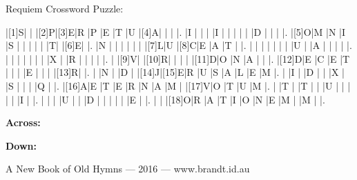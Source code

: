 \documentclass[12pt]{article}
\begin{document}
\libertine
\renewcommand\PuzzleClueFont{\rm\normalsize}
\begin{center}
  \huge{Requiem Crossword Puzzle:}
\end{center}
\vspace{1.5cm}
\begin{Puzzle}{15}{15}
  |[1]S|{}  |{}  |[2]P|[3]E|R   |P   |E   |T   |U   |[4]A|{}  |{}  |{}  |.
  |I   |{}  |{}  |{}  |I   |{}  |{}  |{}  |{}  |{}  |D   |{}  |{}  |{}  |.
  |[5]O|M   |N   |I   |S   |{}  |{}  |{}  |{}  |{}  |T|{}  |[6]E|{}  |.
  |N   |{}  |{}  |{}  |{}  |{}  |{}  |[7]L|U   |[8]C|E   |A   |T   |{}  |.
  |{}  |{}  |{}  |{}  |{}  |{}  |{}  |U   |{}  |A   |{}  |{}  |{}  |{}  |.
  |{}  |{}  |{}  |{}  |{}  |{}  |{}  |X   |{}  |R   |{}  |{}  |{}  |{}  |.
  |{}  |[9]V|{}  |[10]R|{}  |{}  |{}  |{}  |[11]D|O   |N   |A   |{}  |{}  |.
  |[12]D|E   |C   |E   |T   |{}  |{}  |{}  |E   |{}  |{}  |{}  |[13]R|{}  |.
  |{}  |N   |{}  |D   |{}  |[14]J|[15]E|R   |U   |S   |A   |L   |E   |M   |.
  |{}  |I   |{}  |D   |{}  |{}  |X   |{}  |S   |{}  |{}  |{}  |Q   |{}  |.
  |[16]A|E   |T   |E   |R   |N   |A   |M   |{}  |[17]V|O   |T   |U   |M   |.
  |{}  |T   |{}  |T   |{}  |{}  |U   |{}  |{}  |{}  |{}  |{}  |I   |{}  |.
  |{}  |{}  |{}  |U   |{}  |{}  |D   |{}  |{}  |{}  |{}  |{}  |E   |{}  |.
  |{}  |{}  |[18]O|R   |A   |T   |I   |O   |N   |E   |M   |{}  |M   |{}  |.
\end{Puzzle}
\begin{PuzzleClues}{\textbf{Across:}}
\end{PuzzleClues}
\begin{PuzzleClues}{\textbf{Down:}}
\end{PuzzleClues}

\bigskip

\vfill

\centerline{A New Book of Old Hymns --- 2016 --- www.brandt.id.au}
\eject
\end{document}

